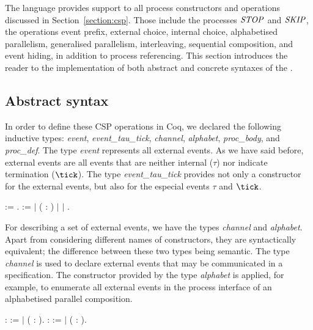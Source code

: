 The \CSPcoq{} language provides support to all process constructors and operations discussed in Section~\ref{section:csp}. Those include the processes $ \mathit{\mathord{{STOP}}} $ and $ \mathit{\mathord{{SKIP}}} $, the operations event prefix, external choice, internal choice, alphabetised parallelism, generalised parallelism, interleaving, sequential composition, and event hiding, in addition to process referencing. This section introduces the reader to the implementation of both abstract and concrete syntaxes of the \CSPcoq{}.

\subsection{Abstract syntax}

In order to define these CSP operations in Coq, we declared the following inductive types: \emph{event}, \emph{event\_tau\_tick}, \emph{channel}, \emph{alphabet}, \emph{proc\_body}, and \emph{proc\_def}. The type \emph{event} represents all external events. As we have said before, external events are all events that are neither internal ($ \tau $) nor indicate termination ($ \tick $). The type \emph{event\_tau\_tick} provides not only a constructor for the external events, but also for the especial events $ \tau $ and $ \tick $.

\begin{coqdoccode}
	\coqdocnoindent
	  := .\coqdoceol
	\coqdocnoindent
	  :=\coqdoceol
	\coqdocindent{1.00em}
	\ensuremath{|}  ( : )\coqdoceol
	\coqdocindent{1.00em}
	\ensuremath{|} \coqdoceol
	\coqdocindent{1.00em}
	\ensuremath{|} .\coqdoceol
\end{coqdoccode}

For describing a set of external events, we have the types \emph{channel} and \emph{alphabet}. Apart from considering different names of constructors, they are syntactically equivalent; the difference between these two types being semantic. The type \emph{channel} is used to declare external events that may be communicated in a \CSPcoq{} specification. The constructor provided by the type \emph{alphabet} is applied, for example, to enumerate all external events in the process interface of an alphabetised parallel composition.

\begin{coqdoccode}
	\coqdocnoindent
	  :  :=\coqdoceol
	\coqdocindent{1.00em}
	\ensuremath{|}  ( :  ).\coqdoceol
	\coqdocnoindent
	  :  :=\coqdoceol
	\coqdocindent{1.00em}
	\ensuremath{|}  ( :  ).\coqdoceol
\end{coqdoccode}

